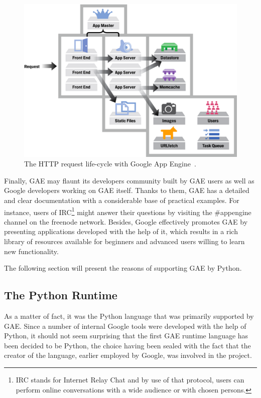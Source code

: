 \begin{figure}[ht]
\begin{center}
\includegraphics[scale=0.4]{img/gae_request.png}
\caption{The HTTP request life-cycle with Google App Engine~\cite{gae_request_cycle}.}
\label{fig:gae_request_cycle}
\end{center}
\end{figure}

Finally, GAE may flaunt its developers community built by GAE users as well as Google developers working on GAE itself. Thanks to them, GAE has a detailed and clear documentation with a considerable base of practical examples. For instance, users of IRC\footnote{IRC stands for Internet Relay Chat and by use of that protocol, users can perform online conversations with a wide audience or with chosen persons.} might answer their questions by visiting the \#appengine channel on the freenode network. Besides, Google effectively promotes GAE by presenting applications developed with the help of it, which results in a rich library of resources available for beginners and advanced users willing to learn new functionality.

The following section will present the reasons of supporting GAE by Python. 
  
  
\subsection{The Python Runtime}\label{subsec:gae_py}
As a matter of fact, it was the Python language that was primarily supported by GAE. Since a number of internal Google tools were developed with the help of Python, it should not seem surprising that the first GAE runtime language has been decided to be Python, the choice having been sealed with the fact that the creator of the language, earlier employed by Google, was involved in the project.

